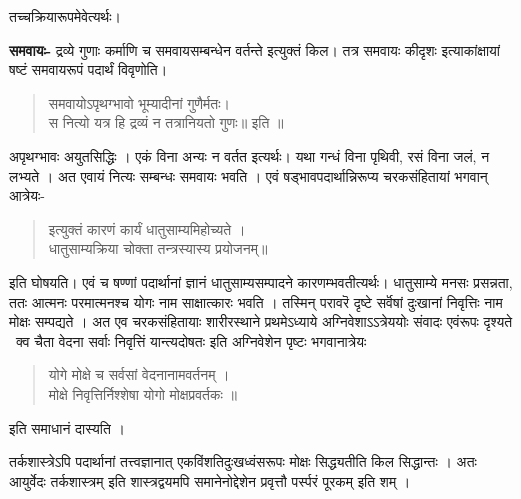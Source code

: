 {तच्चक्रियारूपमेवेत्यर्थः।

\textbf{समवायः-} द्रव्ये गुणाः कर्माणि च समवायसम्बन्धेन वर्तन्ते इत्युक्तं किल। तत्र समवायः कीदृशः इत्याकांक्षायां षष्टं समवायरूपं पदार्थं विवृणोति।
\begin{verse}
समवायोऽपृथग्भावो भूम्यादीनां गुणैर्मतः।\\
स नित्यो यत्र हि द्रव्यं न तत्रानियतो गुणः॥ इति ॥
\end{verse}
अपृथग्भावः अयुतसिद्धिः । एकं विना अन्यः न वर्तत इत्यर्थः। यथा गन्धं विना पृथिवी, रसं विना जलं, न लभ्यते । अत एवायं नित्यः सम्बन्धः समवायः भवति । एवं षड्भावपदार्थान्निरूप्य चरकसंहितायां भगवान् आत्रेयः-
\begin{verse}
इत्युक्तं कारणं कार्यं धातुसाम्यमिहोच्यते ।\\
धातुसाम्यक्रिया चोक्ता तन्त्रस्यास्य प्रयोजनम्॥
\end{verse}
इति घोषयति। एवं च षण्णां पदार्थानां ज्ञानं धातुसाम्यसम्पादने कारणम्भवतीत्यर्थः। धातुसाम्ये मनसः प्रसन्नता, ततः आत्मनः परमात्मनश्च योगः नाम साक्षात्कारः भवति । तस्मिन् परावरॆ दृष्टे सर्वॆषां दुःखानां निवृत्तिः नाम मोक्षः सम्पद्यते । अत एव चरकसंहितायाः शारीरस्थाने प्रथमेऽध्याये अग्निवेशाऽऽत्रेययोः संवादः एवंरूपः दृश्यते \ क्व चैता वेदना सर्वाः निवृत्तिं यान्त्यदोषतः इति अग्निवेशेन पृष्टः भगवानात्रेयः
\begin{verse}
योगे मोक्षे च सर्वसां वेदनानामवर्तनम् ।\\
मोक्षे निवृत्तिर्निश्शेषा योगो मोक्षप्रवर्तकः ॥
\end{verse}
इति समाधानं दास्यति ।

तर्कशास्त्रेऽपि पदार्थानां तत्त्वज्ञानात् एकविंशतिदुःखध्वंसरूपः मोक्षः सिद्ध्यतीति किल सिद्धान्तः । अतः आयुर्वेदः तर्कशास्त्रम् इति शास्त्रद्वयमपि समानेनोद्देशेन प्रवृत्तौ पर्स्परं पूरकम् इति शम् ।

\articleend
}
